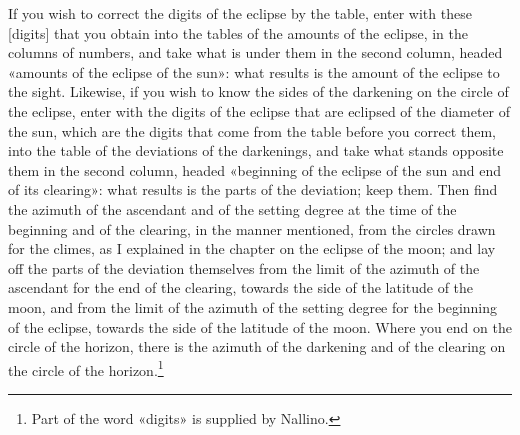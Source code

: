 \documentclass[11pt]{article}
\begin{document}
\par If you wish to correct the digits of the eclipse by the table, enter with these [digits] that you obtain into the tables of the amounts of the eclipse, in the columns of numbers, and take what is under them in the second column, headed «amounts of the eclipse of the sun»: what results is the amount of the eclipse to the sight. Likewise, if you wish to know the sides of the darkening on the circle of the eclipse, enter with the digits of the eclipse that are eclipsed of the diameter of the sun, which are the digits that come from the table before you correct them, into the table of the deviations of the darkenings, and take what stands opposite them in the second column, headed «beginning of the eclipse of the sun and end of its clearing»: what results is the parts of the deviation; keep them. Then find the azimuth of the ascendant and of the setting degree at the time of the beginning and of the clearing, in the manner mentioned, from the circles drawn for the climes, as I explained in the chapter on the eclipse of the moon; and lay off the parts of the deviation themselves from the limit of the azimuth of the ascendant for the end of the clearing, towards the side of the latitude of the moon, and from the limit of the azimuth of the setting degree for the beginning of the eclipse, towards the side of the latitude of the moon. Where you end on the circle of the horizon, there is the azimuth of the darkening and of the clearing on the circle of the horizon.\footnote{Part of the word «digits» is supplied by Nallino.}\par
\end{document}
